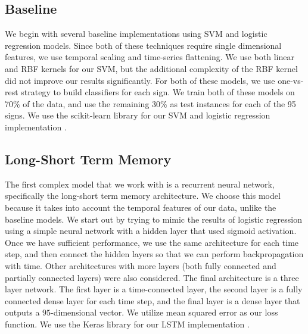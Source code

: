 \documentclass[twocolumn]{article}
\begin{document}
\subsection{Baseline}
We begin with several baseline implementations using SVM and logistic regression models. Since both of these techniques require single dimensional features, we use temporal scaling and time-series flattening. We use both linear and RBF kernels for our SVM, but the additional complexity of the RBF kernel did not improve our results significantly. For both of these models, we use one-vs-rest strategy to build classifiers for each sign. We train both of these models on 70\% of the data, and use the remaining 30\% as test instances for each of the 95 signs. We use the scikit-learn library for our SVM and logistic regression implementation \cite{scikit-learn}.

\subsection{Long-Short Term Memory}
The first complex model that we work with is a recurrent neural network, specifically the long-short term memory architecture. We choose this model because it takes into account the temporal features of our data, unlike the baseline models. We start out by trying to mimic the results of logistic regression using a simple neural network with a hidden layer that used sigmoid activation. Once we have sufficient performance, we use the same architecture for each time step, and then connect the hidden layers so that we can perform backpropagation with time. Other architectures with more layers (both fully connected and partially connected layers) were also considered. The final architecture is a three layer network. The first layer is a time-connected layer, the second layer is a fully connected dense layer for each time step, and the final layer is a dense layer that outputs a $95$-dimensional vector. We utilize mean squared error as our loss function. We use the Keras library for our LSTM implementation \cite{keras}.
\end{document}
